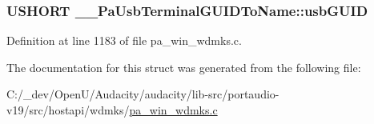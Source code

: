 \subsubsection[{\texorpdfstring{usb\+G\+U\+ID}{usbGUID}}]{\setlength{\rightskip}{0pt plus 5cm}U\+S\+H\+O\+RT \+\_\+\+\_\+\+Pa\+Usb\+Terminal\+G\+U\+I\+D\+To\+Name\+::usb\+G\+U\+ID}\hypertarget{struct_____pa_usb_terminal_g_u_i_d_to_name_afab660656e1e36e90d94c3e41cff7abc}{}\label{struct_____pa_usb_terminal_g_u_i_d_to_name_afab660656e1e36e90d94c3e41cff7abc}


Definition at line 1183 of file pa\+\_\+win\+\_\+wdmks.\+c.



The documentation for this struct was generated from the following file\+:\begin{DoxyCompactItemize}
\item 
C\+:/\+\_\+dev/\+Open\+U/\+Audacity/audacity/lib-\/src/portaudio-\/v19/src/hostapi/wdmks/\hyperlink{pa__win__wdmks_8c}{pa\+\_\+win\+\_\+wdmks.\+c}\end{DoxyCompactItemize}
